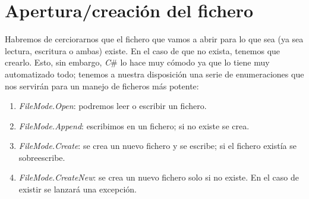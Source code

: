 \documentclass[11pt, oneside]{book}		%
\begin{document}
	\section{Apertura/creación del fichero}
	Habremos de cerciorarnos que el fichero que vamos a abrir para lo que sea (ya sea lectura, escritura o ambas) existe. En el caso de que no exista, tenemos que crearlo. Esto, sin embargo, \textit{C}\# lo hace muy cómodo ya que lo tiene muy automatizado todo; tenemos a nuestra disposición una serie de enumeraciones que nos servirán para un manejo de ficheros más potente:
	\begin{enumerate}
		\item \textit{FileMode.Open}: podremos leer o escribir un fichero.
		\item \textit{FileMode.Append}: escribimos en un fichero; si no existe se crea. 
		\item \textit{FileMode.Create}: se crea un nuevo fichero y se escribe; si el fichero existía se sobreescribe.
		\item \textit{FileMode.CreateNew}: se crea un nuevo fichero solo si no existe. En el caso de existir se lanzará una excepción.
	\end{enumerate}
\end{document}
